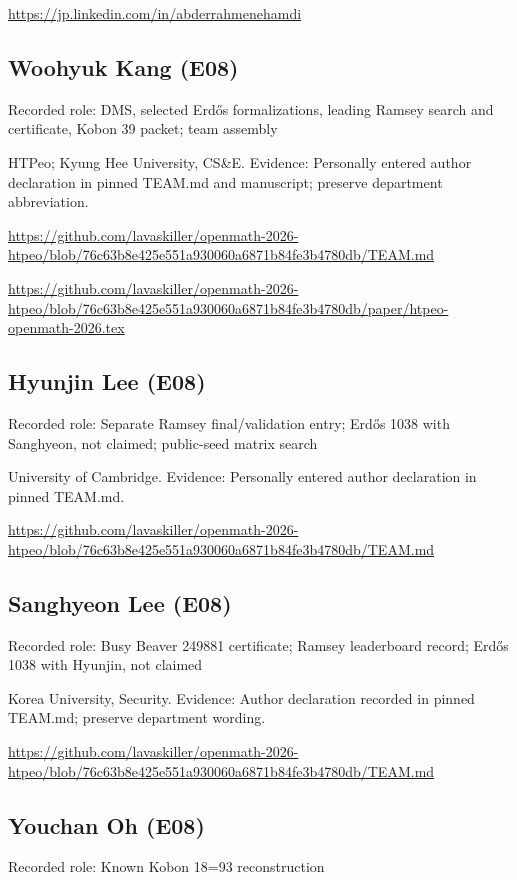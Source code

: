 \documentclass[11pt,a4paper]{article}
\begin{document}
{\small \url{https://jp.linkedin.com/in/abderrahmenehamdi}\par}

\subsection{Woohyuk Kang (E08)}
Recorded role: DMS, selected Erdős formalizations, leading Ramsey search and certificate, Kobon 39 packet; team assembly

HTPeo; Kyung Hee University, CS\&E. Evidence: Personally entered author declaration in pinned TEAM.md and manuscript; preserve department abbreviation.

{\small \url{https://github.com/lavaskiller/openmath-2026-htpeo/blob/76c63b8e425e551a930060a6871b84fe3b4780db/TEAM.md}\par}

{\small \url{https://github.com/lavaskiller/openmath-2026-htpeo/blob/76c63b8e425e551a930060a6871b84fe3b4780db/paper/htpeo-openmath-2026.tex}\par}

\subsection{Hyunjin Lee (E08)}
Recorded role: Separate Ramsey final/validation entry; Erdős 1038 with Sanghyeon, not claimed; public-seed matrix search

University of Cambridge. Evidence: Personally entered author declaration in pinned TEAM.md.

{\small \url{https://github.com/lavaskiller/openmath-2026-htpeo/blob/76c63b8e425e551a930060a6871b84fe3b4780db/TEAM.md}\par}

\subsection{Sanghyeon Lee (E08)}
Recorded role: Busy Beaver 249881 certificate; Ramsey leaderboard record; Erdős 1038 with Hyunjin, not claimed

Korea University, Security. Evidence: Author declaration recorded in pinned TEAM.md; preserve department wording.

{\small \url{https://github.com/lavaskiller/openmath-2026-htpeo/blob/76c63b8e425e551a930060a6871b84fe3b4780db/TEAM.md}\par}

\subsection{Youchan Oh (E08)}
Recorded role: Known Kobon 18=93 reconstruction
\end{document}
